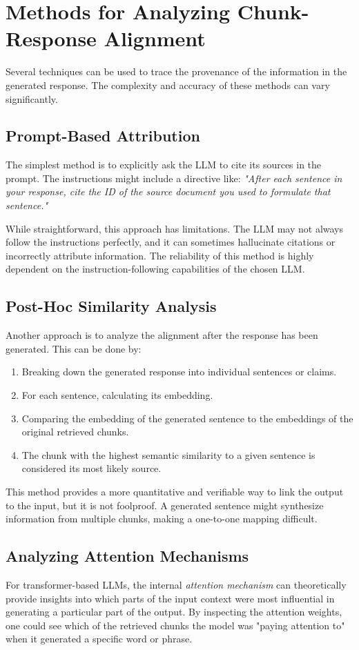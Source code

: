 \section{Methods for Analyzing Chunk-Response Alignment}
Several techniques can be used to trace the provenance of the information in the generated response. The complexity and accuracy of these methods can vary significantly.

\subsection{Prompt-Based Attribution}
The simplest method is to explicitly ask the LLM to cite its sources in the prompt. The instructions might include a directive like: \textit{"After each sentence in your response, cite the ID of the source document you used to formulate that sentence."}

While straightforward, this approach has limitations. The LLM may not always follow the instructions perfectly, and it can sometimes hallucinate citations or incorrectly attribute information. The reliability of this method is highly dependent on the instruction-following capabilities of the chosen LLM.

\subsection{Post-Hoc Similarity Analysis}
Another approach is to analyze the alignment after the response has been generated. This can be done by:
\begin{enumerate}
    \item Breaking down the generated response into individual sentences or claims.
    \item For each sentence, calculating its embedding.
    \item Comparing the embedding of the generated sentence to the embeddings of the original retrieved chunks.
    \item The chunk with the highest semantic similarity to a given sentence is considered its most likely source.
\end{enumerate}

This method provides a more quantitative and verifiable way to link the output to the input, but it is not foolproof. A generated sentence might synthesize information from multiple chunks, making a one-to-one mapping difficult.

\subsection{Analyzing Attention Mechanisms}
For transformer-based LLMs, the internal \textit{attention mechanism} can theoretically provide insights into which parts of the input context were most influential in generating a particular part of the output. By inspecting the attention weights, one could see which of the retrieved chunks the model was "paying attention to" when it generated a specific word or phrase.

